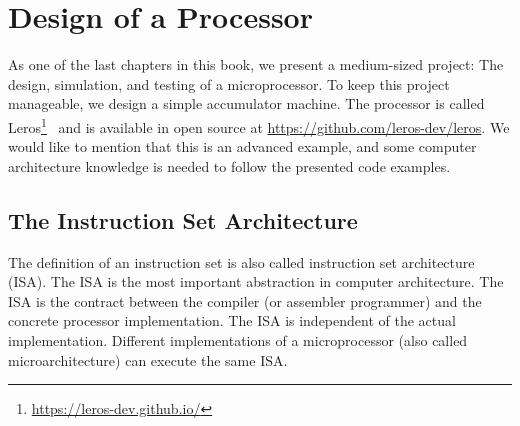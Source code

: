 \documentclass[%
    10pt,
    headinclude, footinclude=false,
    openright, %
    notitlepage,
    cleardoublepage=empty,
    headsepline,
    numbers=noenddot,
    bibliography=totoc, index=totoc,
    ]{scrbook}
\newcommand{\myref}[2]{\href{#1}{#2}}
\renewcommand{\myref}[2]{{#2}{\footnote{\url{#1}}}}
\begin{document}
\chapter{Design of a Processor}
\label{chap:leros}


As one of the last chapters in this book, we present a medium-sized project:
The design, simulation, and testing of a microprocessor.
To keep this project manageable, we design a simple accumulator machine.
The processor is called \myref{https://leros-dev.github.io/}{Leros}~\cite{leros:arcs2019}
and is available in open source at \url{https://github.com/leros-dev/leros}.
We would like to mention that this is an advanced example, and some computer
architecture knowledge is needed to follow the presented code examples.

\section{The Instruction Set Architecture}

The definition of an instruction set is also called instruction set architecture (ISA).
The ISA is the most important abstraction in computer architecture.
The ISA is the contract between the compiler (or assembler programmer) and the
concrete processor implementation.
The ISA is independent of the actual implementation.
Different implementations of a microprocessor (also called microarchitecture)
can execute the same ISA.
\end{document}
